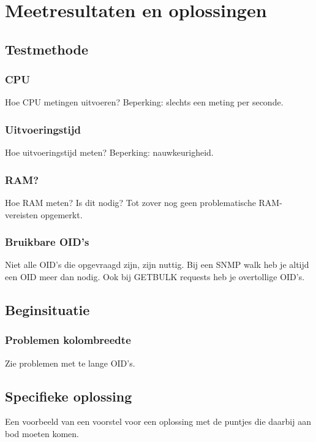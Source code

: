 \chapter{Meetresultaten en oplossingen}

\section{Testmethode}

\subsection{CPU}
Hoe CPU metingen uitvoeren? Beperking: slechts een meting per seconde.

\subsection{Uitvoeringstijd}
Hoe uitvoeringstijd meten? Beperking: nauwkeurigheid.

\subsection{RAM?}
Hoe RAM meten? Is dit nodig? Tot zover nog geen problematische RAM-vereisten opgemerkt.

\subsection{Bruikbare OID's}
Niet alle OID's die opgevraagd zijn, zijn nuttig. Bij een SNMP walk heb je altijd een OID meer dan nodig.
Ook bij GETBULK requests heb je overtollige OID's.


\section{Beginsituatie}

\subsection{Problemen kolombreedte}
Zie problemen met te lange OID's.

\section{Specifieke oplossing}
Een voorbeeld van een voorstel voor een oplossing met de puntjes die daarbij aan bod moeten komen.

